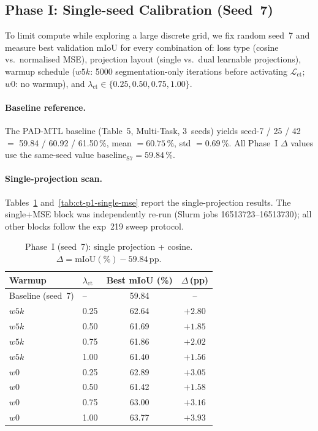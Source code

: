 \subsection{Phase I: Single-seed Calibration (Seed~7)}
\label{subsec:ct-phase1-seed7}

To limit compute while exploring a large discrete grid, we fix random
seed~7 and measure best validation mIoU for every combination of:
loss type (cosine vs.\ normalised MSE), projection layout (single vs.\
dual learnable projections), warmup schedule ($w5k$: 5000
segmentation-only iterations before activating $\mathcal{L}_\text{ct}$;
$w0$: no warmup), and
$\lambda_\text{ct}\in\{0.25, 0.50, 0.75, 1.00\}$.

\paragraph{Baseline reference.}
The PAD-MTL baseline (Table~5, Multi-Task, 3~seeds) yields
seed-7 / 25 / 42 $=$ 59.84 / 60.92 / 61.50\,\%,
mean $= 60.75$\,\%, std $= 0.69$\,\%.
All Phase~I $\Delta$ values use the same-seed value
$\text{baseline}_{\text{S7}} = 59.84$\,\%.

\paragraph{Single-projection scan.}
Tables~\ref{tab:ct-p1-single-cos} and~\ref{tab:ct-p1-single-mse}
report the single-projection results. The single+MSE block was
independently re-run (Slurm jobs 16513723--16513730); all other blocks
follow the exp~219 sweep protocol.

\begin{table}[H]
\centering
\caption{Phase~I (seed~7): single projection + cosine.
$\Delta = \text{mIoU}(\%) - 59.84$\,pp.}
\label{tab:ct-p1-single-cos}
\renewcommand{\arraystretch}{1.2}
\begin{tabular}{llcc}
\toprule
Warmup & $\lambda_\text{ct}$ & Best mIoU (\%) & $\Delta$\,(pp) \\
\midrule
Baseline (seed~7) & -- & 59.84 & -- \\
\midrule
$w5k$ & 0.25 & 62.64 & $+2.80$ \\
$w5k$ & 0.50 & 61.69 & $+1.85$ \\
$w5k$ & 0.75 & 61.86 & $+2.02$ \\
$w5k$ & 1.00 & 61.40 & $+1.56$ \\
\midrule
$w0$  & 0.25 & 62.89 & $+3.05$ \\
$w0$  & 0.50 & 61.42 & $+1.58$ \\
$w0$  & 0.75 & 63.00 & $+3.16$ \\
$w0$  & 1.00 & 63.77 & $+3.93$ \\
\bottomrule
\end{tabular}
\end{table}

